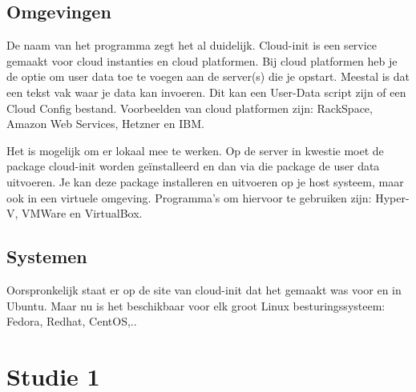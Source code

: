 \subsection{Omgevingen}
De naam van het programma zegt het al duidelijk. Cloud-init is een service gemaakt voor cloud instanties en cloud platformen. Bij cloud platformen heb je de optie om user data toe te voegen aan de server(s) die je opstart. Meestal is dat een tekst vak waar je data kan invoeren. Dit kan een User-Data script zijn of een Cloud Config bestand. Voorbeelden van cloud platformen zijn: RackSpace, Amazon Web Services, Hetzner en IBM. 

Het is mogelijk om er lokaal mee te werken. Op de server in kwestie moet de package cloud-init worden geïnstalleerd en dan via die package de user data uitvoeren. Je kan deze package installeren en uitvoeren op je host systeem, maar ook in een virtuele omgeving. Programma's om hiervoor te gebruiken zijn: Hyper-V, VMWare en VirtualBox.

\subsection{Systemen}
Oorspronkelijk staat er op de site van cloud-init \autocite{cloudsite} dat het gemaakt was voor en in Ubuntu. Maar nu is het beschikbaar voor elk groot Linux besturingssysteem: Fedora, Redhat, CentOS,..


\section{Studie 1}

